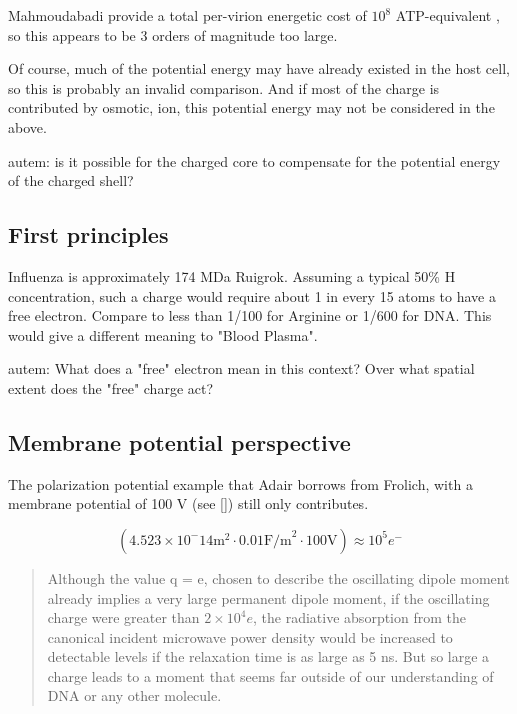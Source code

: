 \documentclass[paper.tex]{subfiles}
\begin{document}

Mahmoudabadi\cite{Energetic2017} provide a total per-virion energetic cost of $10^8 $ ATP-equivalent , so this appears to be 3 orders of magnitude too large.

Of course, much of the potential energy may have already existed in the host cell, so this is probably an invalid comparison. And if most of the charge is contributed by osmotic, ion, this potential energy may not be considered in the above. 

\begin{autem}
	autem: is it possible for the charged core to compensate for the potential energy of the charged shell?
\end{autem}

\subsection{First principles}

Influenza is approximately 174 MDa Ruigrok. Assuming a typical 50\% H concentration, such a charge would require about 1 in every 15 atoms to have a free electron. Compare to less than 1/100 for Arginine or 1/600 for DNA. This would give a different meaning to "Blood Plasma".

\begin{autem}
	autem: What does a "free" electron mean in this context? Over what spatial extent does the "free" charge act?
\end{autem}



\subsection{Membrane potential perspective}


The polarization potential example that Adair borrows from Frolich, with a membrane potential of 100 V (see []) still only contributes.  

$$(4.523 \times 10^-14 \text{m}^2 \cdot 0.01 \text{F/m}^2 \cdot 100 \text{V}) \approx 10^5 e^- $$



\cite{Vibrational2002}
\begin{quote}
	Although the value q = e, chosen to describe the oscillating dipole moment already implies a very large permanent dipole moment, if the oscillating charge were greater
	than $2\times 10^4 e$, the radiative absorption from the canonical
	incident microwave power density would be increased to
	detectable levels if the relaxation time is as large as 5 ns.
	But so large a charge leads to a moment that seems far
	outside of our understanding of DNA or any other molecule.
	
	

\end{quote}
\end{document}
